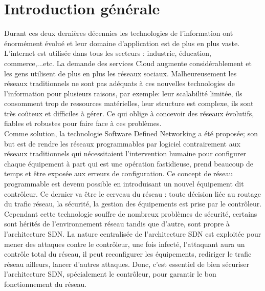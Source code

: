 
\chapter{Introduction générale} 

\label{Introduction} 
Durant ces deux dernières décennies les technologies de l’information ont  énormément évolué et leur domaine d’application est de plus en plus vaste. L’internet est utilisée dans tous les secteurs : industrie, éducation, commerce,...etc. La demande des services Cloud augmente considérablement et les gens utilisent de plus en plus les réseaux sociaux. Malheureusement les réseaux traditionnels ne sont pas adéquats à ces nouvelles technologies de l’information  pour plusieurs raisons, par exemple: leur scalabilité limitée, ils consomment trop de ressources matérielles,  leur structure est complexe, ils sont très coûteux et difficiles à gérer.  Ce qui oblige à concevoir des réseaux évolutifs, fiables et robustes pour faire face à ces problèmes.\\

	Comme solution, la technologie Software Defined Networking a été proposée; son but est de rendre les réseaux programmables par logiciel contrairement aux réseaux traditionnels qui nécessitaient l’intervention humaine  pour configurer chaque équipement à part qui est une opération fastidieuse, prend beaucoup de temps et être exposée aux erreurs de configuration. Ce concept de réseau programmable est devenu possible en introduisant un nouvel équipement dit contrôleur. Ce dernier va être le cerveau du réseau : toute décision liée au routage du trafic réseau, la sécurité, la gestion des équipements est prise par le contrôleur.\\
	
	Cependant cette technologie souffre de nombreux problèmes de sécurité, certains sont hérités de l’environnement réseau tandis que d’autre, sont propre à l’architecture SDN. La nature centralisée de l’architecture SDN est exploitée pour mener des attaques contre le contrôleur, une fois infecté, l’attaquant aura un contrôle total du réseau, il peut reconfigurer les équipements, rediriger le trafic réseau ailleurs, lancer d’autres attaques. Donc, c'est essentiel de bien sécuriser l'architecture SDN, spécialement le contrôleur, pour garantir le bon fonctionnement du réseau.\\
	
